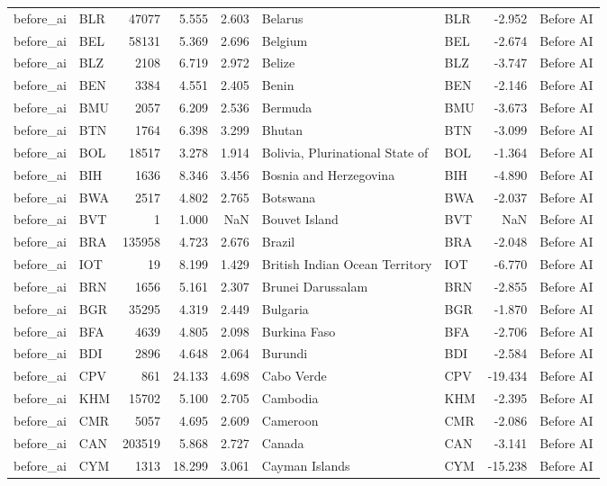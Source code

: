 \begin{tabular}{llrrrllrl}
before\_ai & BLR & 47077 & 5.555 & 2.603 & Belarus & BLR & -2.952 & Before AI \\
before\_ai & BEL & 58131 & 5.369 & 2.696 & Belgium & BEL & -2.674 & Before AI \\
before\_ai & BLZ & 2108 & 6.719 & 2.972 & Belize & BLZ & -3.747 & Before AI \\
before\_ai & BEN & 3384 & 4.551 & 2.405 & Benin & BEN & -2.146 & Before AI \\
before\_ai & BMU & 2057 & 6.209 & 2.536 & Bermuda & BMU & -3.673 & Before AI \\
before\_ai & BTN & 1764 & 6.398 & 3.299 & Bhutan & BTN & -3.099 & Before AI \\
before\_ai & BOL & 18517 & 3.278 & 1.914 & Bolivia, Plurinational State of & BOL & -1.364 & Before AI \\
before\_ai & BIH & 1636 & 8.346 & 3.456 & Bosnia and Herzegovina & BIH & -4.890 & Before AI \\
before\_ai & BWA & 2517 & 4.802 & 2.765 & Botswana & BWA & -2.037 & Before AI \\
before\_ai & BVT & 1 & 1.000 & NaN & Bouvet Island & BVT & NaN & Before AI \\
before\_ai & BRA & 135958 & 4.723 & 2.676 & Brazil & BRA & -2.048 & Before AI \\
before\_ai & IOT & 19 & 8.199 & 1.429 & British Indian Ocean Territory & IOT & -6.770 & Before AI \\
before\_ai & BRN & 1656 & 5.161 & 2.307 & Brunei Darussalam & BRN & -2.855 & Before AI \\
before\_ai & BGR & 35295 & 4.319 & 2.449 & Bulgaria & BGR & -1.870 & Before AI \\
before\_ai & BFA & 4639 & 4.805 & 2.098 & Burkina Faso & BFA & -2.706 & Before AI \\
before\_ai & BDI & 2896 & 4.648 & 2.064 & Burundi & BDI & -2.584 & Before AI \\
before\_ai & CPV & 861 & 24.133 & 4.698 & Cabo Verde & CPV & -19.434 & Before AI \\
before\_ai & KHM & 15702 & 5.100 & 2.705 & Cambodia & KHM & -2.395 & Before AI \\
before\_ai & CMR & 5057 & 4.695 & 2.609 & Cameroon & CMR & -2.086 & Before AI \\
before\_ai & CAN & 203519 & 5.868 & 2.727 & Canada & CAN & -3.141 & Before AI \\
before\_ai & CYM & 1313 & 18.299 & 3.061 & Cayman Islands & CYM & -15.238 & Before AI \\

\end{tabular}
